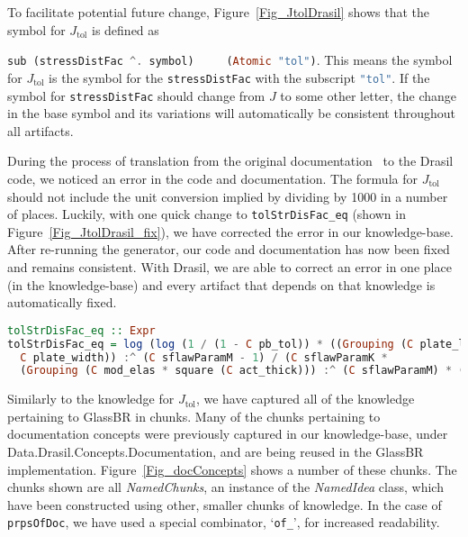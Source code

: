 \documentclass[sigconf]{acmart}
\newcommand{\jtol}{$J_{\mbox{tol}}$}
\newcommand{\inlHask}[1]{\lstinline[language=Haskell, columns=fullflexible,
  basicstyle=\ttfamily, showstringspaces=false, breaklines=true]{#1}}
\begin{document}
To facilitate potential future change, Figure~\ref{Fig_JtolDrasil} shows that
the symbol for \jtol{} is defined as {\inlHask{sub (stressDistFac ^. symbol)
    (Atomic "tol")}.  This means the symbol for \jtol{} is the symbol for the
  {\inlHask{stressDistFac}} with the subscript {\inlHask{"tol"}}.  If the symbol
  for {\inlHask{stressDistFac}} should change from $J$ to some other letter, the
  change in the base symbol and its variations will automatically be consistent
  throughout all artifacts.

During the process of translation from the original
documentation~\cite{SmithJegatheesanAndKelly2016} to the Drasil code, we noticed
an error in the code and documentation. The formula for \jtol{} should not
include the unit conversion implied by dividing by 1000 in a number of
places. Luckily, with one quick change to {\inlHask{tolStrDisFac_eq}} (shown in
Figure~\ref{Fig_JtolDrasil_fix}), we have corrected the error in our
knowledge-base. After re-running the generator, our code and documentation has
now been fixed and remains consistent.  With Drasil, we are able to correct an
error in one place (in the knowledge-base) and every artifact that depends on
that knowledge is automatically fixed.

\begin{figure*}
\begin{lstlisting}[language=Haskell, frame=single, showstringspaces=false, basicstyle=\small]
tolStrDisFac_eq :: Expr
tolStrDisFac_eq = log (log (1 / (1 - C pb_tol)) * ((Grouping (C plate_len * 
  C plate_width)) :^ (C sflawParamM - 1) / (C sflawParamK * 
  (Grouping (C mod_elas * square (C act_thick))) :^ (C sflawParamM) * (C loadDF))))
\end{lstlisting}
\caption{Modified Drasil (Haskell) code for \jtol{} equation}
\label{Fig_JtolDrasil_fix}
\end{figure*}

Similarly to the knowledge for \jtol{}, we have captured all of the knowledge
pertaining to GlassBR in chunks. Many of the chunks pertaining to documentation
concepts were previously captured in our knowledge-base, under
Data.Drasil.Concepts.Documentation, and are being reused in the GlassBR
implementation. Figure~\ref{Fig_docConcepts} shows a number of these chunks. The
chunks shown are all \textit{NamedChunks}, an instance of the \textit{NamedIdea}
class, which have been constructed using other, smaller chunks of knowledge. In
the case of \inlHask{prpsOfDoc}, we have used a special combinator,
`\inlHask{of_}', for increased readability.

}
\end{document}

